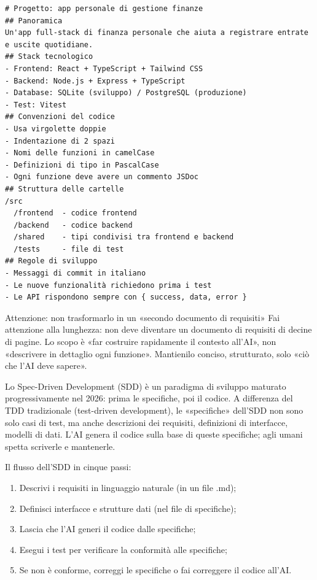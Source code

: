 \begin{lstlisting}
# Progetto: app personale di gestione finanze
## Panoramica
Un'app full-stack di finanza personale che aiuta a registrare entrate e uscite quotidiane.
## Stack tecnologico
- Frontend: React + TypeScript + Tailwind CSS
- Backend: Node.js + Express + TypeScript
- Database: SQLite (sviluppo) / PostgreSQL (produzione)
- Test: Vitest
## Convenzioni del codice
- Usa virgolette doppie
- Indentazione di 2 spazi
- Nomi delle funzioni in camelCase
- Definizioni di tipo in PascalCase
- Ogni funzione deve avere un commento JSDoc
## Struttura delle cartelle
/src
  /frontend  - codice frontend
  /backend   - codice backend
  /shared    - tipi condivisi tra frontend e backend
  /tests     - file di test
## Regole di sviluppo
- Messaggi di commit in italiano
- Le nuove funzionalità richiedono prima i test
- Le API rispondono sempre con { success, data, error }
\end{lstlisting}

\begin{tcbwarn}{Attenzione: non trasformarlo in un «secondo documento di requisiti»}
Fai attenzione alla lunghezza: non deve diventare un documento di requisiti di decine di pagine. Lo scopo è «far costruire rapidamente il contesto all'AI», non «descrivere in dettaglio ogni funzione». Mantienilo conciso, strutturato, solo «ciò che l'AI deve sapere».

\end{tcbwarn}


Lo Spec-Driven Development (SDD) è un paradigma di sviluppo maturato progressivamente nel 2026: prima le specifiche, poi il codice. A differenza del TDD tradizionale (test-driven development), le «specifiche» dell'SDD non sono solo casi di test, ma anche descrizioni dei requisiti, definizioni di interfacce, modelli di dati. L'AI genera il codice sulla base di queste specifiche; agli umani spetta scriverle e mantenerle.

Il flusso dell'SDD in cinque passi:

\begin{enumerate}
  \item Descrivi i requisiti in linguaggio naturale (in un file .md);
  \item Definisci interfacce e strutture dati (nel file di specifiche);
  \item Lascia che l'AI generi il codice dalle specifiche;
  \item Esegui i test per verificare la conformità alle specifiche;
  \item Se non è conforme, correggi le specifiche o fai correggere il codice all'AI.
\end{enumerate}

